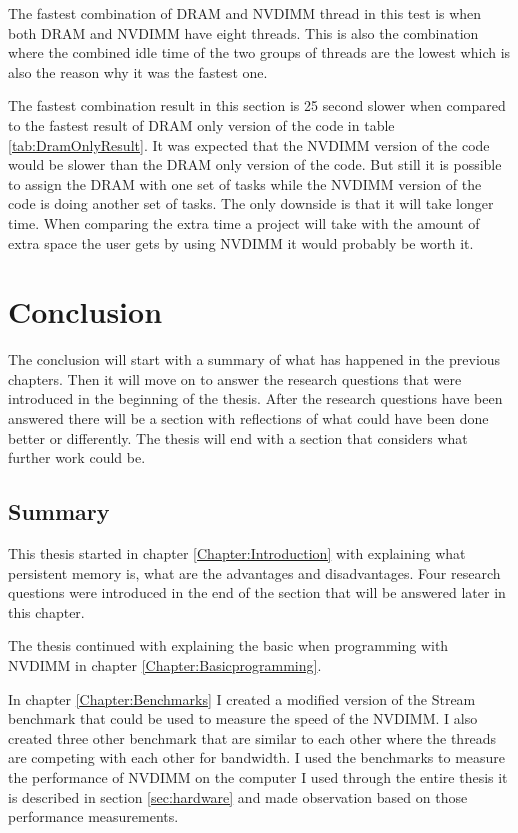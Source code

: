 \documentclass[12pt,a4paper,USenglish]{article}      %
\begin{document}
The fastest combination of DRAM and NVDIMM thread in this test is when both DRAM and NVDIMM have eight threads. This is also the combination where the combined idle time of the two groups of threads are the lowest which is also the reason why it was the fastest one. 

The fastest combination result in this section is 25 second slower when compared to the fastest result of DRAM only version of the code in table \ref{tab:DramOnlyResult}. It was expected that the NVDIMM version of the code would be slower than the DRAM only version of the code. But still it is possible to assign the DRAM with one set of tasks while the NVDIMM version of the code is doing another set of tasks. The only downside is that it will take longer time. When comparing the extra time a project will take with the amount of extra space the user gets by using NVDIMM it would probably be worth it. 

\clearpage
\section{Conclusion}
\label{chapter:conclusion}
The conclusion will start with a summary of what has happened in the previous chapters. Then it will move on to answer the research questions that were introduced in the beginning of the thesis. After the research questions have been answered there will be a section with reflections of what could have been done better or differently. The thesis will end with a section that considers what further work could be. 

\subsection{Summary}
This thesis started in chapter \ref{Chapter:Introduction} with explaining what persistent memory is, what are the advantages and disadvantages. Four research questions were introduced in the end of the section that will be answered later in this chapter. 

The thesis continued with explaining the basic when programming with NVDIMM in chapter \ref{Chapter:Basicprogramming}. 

In chapter \ref{Chapter:Benchmarks} I created a modified version of the Stream benchmark that could be used to measure the speed of the NVDIMM. I also created three other benchmark that are similar to each other where the threads are competing with each other for bandwidth. I used the benchmarks to measure the performance of NVDIMM on the computer I used through the entire thesis it is described in section \ref{sec:hardware} and made observation based on those performance measurements. 
\end{document}

